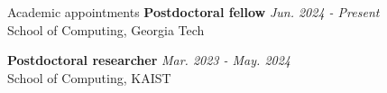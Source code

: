 \begin{rSection}{Academic appointments}
\textbf{Postdoctoral fellow} \hfill {\em Jun. 2024 - Present} \\
  School of Computing, Georgia Tech

\textbf{Postdoctoral researcher} \hfill {\em Mar. 2023 - May. 2024} \\
  School of Computing, KAIST
\end{rSection}

